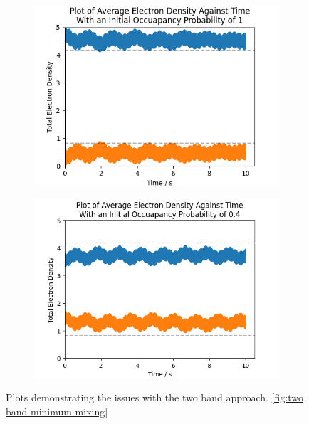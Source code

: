 \begin{figure}[htbp]
\begin{subfigure}{0.45\linewidth}
        \label{fig:two band no diagonal}
    \end{subfigure}
    \begin{subfigure}{0.45\linewidth}
        \includegraphics[width=0.9\linewidth]{Figures/Simulation/Two Small Bands Large Probability Incorrect Equilibrium.png}
        \label{fig:two band incorrect equilibrium above}
    \end{subfigure}
    \begin{subfigure}{0.45\linewidth}
        \includegraphics[width=0.9\linewidth]{Figures/Simulation/Two Small Bands Small Probability Incorrect Equilibrium.png}
        \label{fig:two band incorrect equilibrium below}
    \end{subfigure}
    \caption{
        Plots demonstrating the issues
        with the two band approach.
        \cref{fig:two band minimum mixing}
}
\end{figure}
